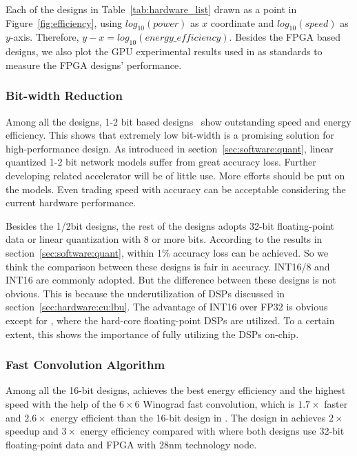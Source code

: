 Each of the designs in Table~\ref{tab:hardware_list} drawn as a point in Figure~\ref{fig:efficiency}, using $log_{10}(power)$ as $x$ coordinate and $log_{10}(speed)$ as $y$-axis. Therefore, $y-x=log_{10}(energy\_efficiency)$. Besides the FPGA based designs, we also plot the GPU experimental results used in \cite{guo2017angel, han2017ese} as standards to measure the FPGA designs' performance.

\subsubsection*{\textbf{Bit-width Reduction}} Among all the designs, 1-2 bit based designs~\cite{jiao2017accelerating, moss2017high, nakahara2017fully} show outstanding speed and energy efficiency. This shows that extremely low bit-width is a promising solution for high-performance design. As introduced in section~\ref{sec:software:quant}, linear quantized 1-2 bit network models suffer from great accuracy loss. Further developing related accelerator will be of little use. More efforts should be put on the models. Even trading speed with accuracy can be acceptable considering the current hardware performance.

Besides the 1/2bit designs, the rest of the designs adopts 32-bit floating-point data or linear quantization with 8 or more bits. According to the results in section~\ref{sec:software:quant}, within 1\% accuracy loss can be achieved. So we think the comparison between these designs is fair in accuracy. INT16/8 and INT16 are commonly adopted. But the difference between these designs is not obvious. This is because the underutilization of DSPs discussed in section~\ref{sec:hardware:cu:lbu}. The advantage of INT16 over FP32 is obvious except for \cite{zhang2017improving}, where the hard-core floating-point DSPs are utilized. To a certain extent, this shows the importance of fully utilizing the DSPs on-chip.

\subsubsection*{\textbf{Fast Convolution Algorithm}} Among all the 16-bit designs, \cite{lu2017evaluating} achieves the best energy efficiency and the highest speed with the help of the $6\times 6$ Winograd fast convolution, which is $1.7\times$ faster and $2.6\times$ energy efficient than the 16-bit design in \cite{zhang2017improving}. The design in \cite{zhang2017frequency} achieves $2\times$ speedup and $3\times$ energy efficiency compared with \cite{zhang2015optimizing} where both designs use 32-bit floating-point data and FPGA with 28nm technology node. 

